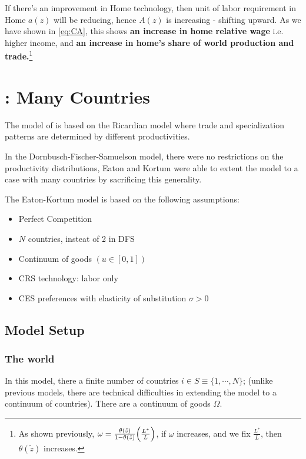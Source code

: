 If there's an improvement in Home technology, then unit of labor requirement in Home $a(z)$ will be reducing, hence $A(z)$ is increasing - shifting upward. 
As we have shown in \ref{eq:CA}, this shows \textbf{an increase in home relative wage} i.e. higher income, 
and \textbf{an increase in home's share of world production and trade.}\footnote{As shown previously, $\omega = \frac{\theta(\tilde{z})}{1-\theta(\tilde{z})} \Bigl(\frac{L^*}{L}\Bigr)$, 
if $\omega$ increases, and we fix $\frac{L^*}{L}$, then $\theta(\tilde{z})$ increases.} 

\section{\cite{eaton2002technology}: Many Countries}
The model of \cite{dornbusch1977comparative} is based on the Ricardian model
where trade and specialization patterns are determined by different productivities.

In the Dornbusch-Fischer-Samuelson model, there were no restrictions on the productivity distributions,
Eaton and Kortum were able to extent the model to a case with many countries by sacrificing this generality.

The Eaton-Kortum model is based on the following assumptions:
\begin{itemize}
    \item Perfect Competition
    \item $N$ countries, insteat of 2 in DFS
    \item Continuum of goods $(u \in [0,1])$
    \item CRS technology: labor only
    \item CES preferences with elasticity of substitution $\sigma > 0$
\end{itemize}

\subsection{Model Setup}

\subsubsection{The world}

In this model, there a finite number of countries $i \in S \equiv \{1, \cdots, N\}$; 
(unlike previous models, there are technical difficulties in extending the model to a continuum of countries).
There are a continuum of goods $\Omega$.

